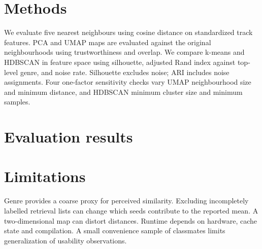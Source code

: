 \section{Methods}
We evaluate five nearest neighbours using cosine distance on standardized track
features. PCA and UMAP maps are evaluated against the original neighbourhoods
using trustworthiness and overlap. We compare k-means and HDBSCAN in feature
space using silhouette, adjusted Rand index against top-level genre, and noise
rate. Silhouette excludes noise; ARI includes noise assignments. Four
one-factor sensitivity checks vary UMAP neighbourhood size and minimum
distance, and HDBSCAN minimum cluster size and minimum samples.

\section{Evaluation results}

\section{Limitations}
Genre provides a coarse proxy for perceived similarity. Excluding incompletely
labelled retrieval lists can change which seeds contribute to the reported
mean. A two-dimensional map can distort distances. Runtime depends on hardware,
cache state and compilation. A small convenience sample of classmates limits
generalization of usability observations.
